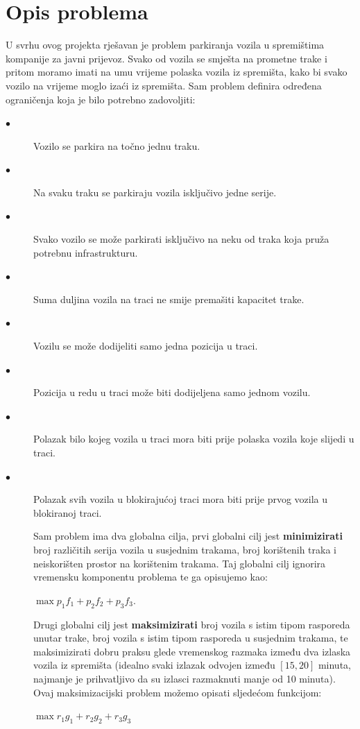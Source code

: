 \documentclass[11pt]{article}
\begin{document}
\section{Opis problema}
U svrhu ovog projekta rješavan je problem parkiranja vozila u spremištima kompanije za javni prijevoz. Svako od vozila se smješta na prometne trake i pritom moramo imati na umu vrijeme polaska vozila iz spremišta, kako bi svako vozilo na vrijeme moglo izaći iz spremišta. Sam problem definira određena ograničenja koja je bilo potrebno zadovoljiti:
\begin{description}
\item[$\bullet$] Vozilo se parkira na točno jednu traku.
\item[$\bullet$] Na svaku traku se parkiraju vozila isključivo jedne serije.
\item[$\bullet$] Svako vozilo se može parkirati isključivo na neku od traka koja pruža potrebnu infrastrukturu.
\item[$\bullet$] Suma duljina vozila na traci ne smije premašiti kapacitet trake.
\item[$\bullet$] Vozilu se može dodijeliti samo jedna pozicija u traci.
\item[$\bullet$] Pozicija u redu u traci može biti dodijeljena samo jednom vozilu.
\item[$\bullet$] Polazak bilo kojeg vozila u traci mora biti prije polaska vozila koje slijedi u traci.
\item[$\bullet$] Polazak svih vozila u blokirajućoj traci mora biti prije prvog vozila u blokiranoj traci.

Sam problem ima dva globalna cilja, prvi globalni cilj jest \textbf{minimizirati} broj različitih serija vozila u susjednim trakama, broj korištenih traka i neiskorišten prostor na korištenim trakama. Taj globalni cilj ignorira vremensku komponentu problema te ga opisujemo kao: \\
\begin{center}
$\max p_1f_1 + p_2f_2 + p_3f_3$.\\
\end{center}


Drugi globalni cilj jest \textbf{maksimizirati} broj vozila s istim tipom rasporeda unutar trake, broj vozila s istim tipom rasporeda u susjednim trakama, te maksimizirati dobru praksu glede vremenskog razmaka između dva izlaska vozila iz spremišta (idealno svaki izlazak odvojen između $[15,20]$ minuta, najmanje je prihvatljivo da su izlasci razmaknuti manje od 10 minuta).
Ovaj maksimizacijski problem možemo opisati sljedećom funkcijom:
\begin{center}
$\max r_1g_1 + r_2g_2 + r_3g_3$
\end{center}


\end{description}
\end{document}
